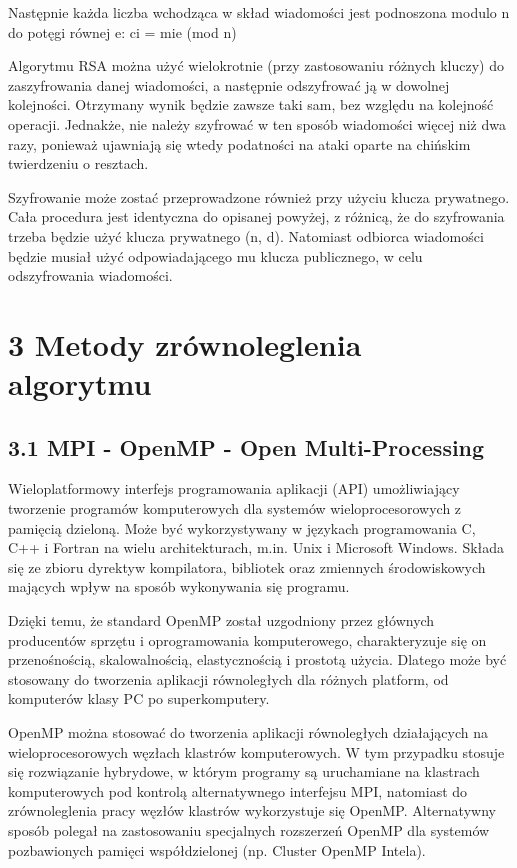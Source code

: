 \documentclass[a4paper,12pt]{article}
\begin{document}
Następnie każda liczba wchodząca w skład wiadomości jest podnoszona modulo n do potęgi równej e:
    ci = mie  (mod n)

Algorytmu RSA można użyć wielokrotnie (przy zastosowaniu różnych kluczy) do zaszyfrowania danej wiadomości, a następnie odszyfrować ją w dowolnej kolejności. Otrzymany wynik będzie zawsze taki sam, bez względu na kolejność operacji. Jednakże, nie należy szyfrować w ten sposób wiadomości więcej niż dwa razy, ponieważ ujawniają się wtedy podatności na ataki oparte na chińskim twierdzeniu o resztach.

Szyfrowanie może zostać przeprowadzone również przy użyciu klucza prywatnego. Cała procedura jest identyczna do opisanej powyżej, z różnicą, że do szyfrowania trzeba będzie użyć klucza prywatnego (n, d). Natomiast odbiorca wiadomości będzie musiał użyć odpowiadającego mu klucza publicznego, w celu odszyfrowania wiadomości.
 

\newpage
\section*{3 Metody zrównoleglenia algorytmu}

\subsection*{3.1 MPI - OpenMP - Open Multi-Processing}

Wieloplatformowy interfejs programowania aplikacji (API) umożliwiający tworzenie programów komputerowych dla systemów wieloprocesorowych z pamięcią dzieloną. Może być wykorzystywany w językach programowania C, C++ i Fortran na wielu architekturach, m.in. Unix i Microsoft Windows. Składa się ze zbioru dyrektyw kompilatora, bibliotek oraz zmiennych środowiskowych mających wpływ na sposób wykonywania się programu.

    Dzięki temu, że standard OpenMP został uzgodniony przez głównych producentów sprzętu i oprogramowania komputerowego, charakteryzuje się on przenośnością, skalowalnością, elastycznością i prostotą użycia. Dlatego może być stosowany do tworzenia aplikacji równoległych dla różnych platform, od komputerów klasy PC po superkomputery.

    OpenMP można stosować do tworzenia aplikacji równoległych działających na wieloprocesorowych węzłach klastrów komputerowych. W tym przypadku stosuje się rozwiązanie hybrydowe, w którym programy są uruchamiane na klastrach komputerowych pod kontrolą alternatywnego interfejsu MPI, natomiast do zrównoleglenia pracy węzłów klastrów wykorzystuje się OpenMP. Alternatywny sposób polegał na zastosowaniu specjalnych rozszerzeń OpenMP dla systemów pozbawionych pamięci współdzielonej (np. Cluster OpenMP Intela).
\end{document}
